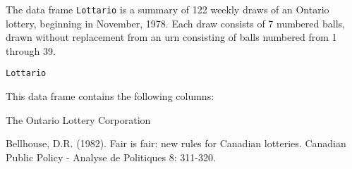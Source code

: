 \begin{Description}\relax
The data frame \verb!Lottario!
is a summary of 122 weekly draws of an Ontario lottery, beginning in
November, 1978.  Each draw consists of 7 numbered balls, drawn without
replacement from an urn consisting of balls numbered from 1 through 39.
\end{Description}
\begin{Usage}
\begin{verbatim}Lottario\end{verbatim}
\end{Usage}
\begin{Format}\relax
This data frame contains the following columns:
\end{Format}
\begin{Source}\relax
The Ontario Lottery Corporation
\end{Source}
\begin{References}\relax
Bellhouse, D.R. (1982). Fair is fair:  new rules for Canadian lotteries.
Canadian Public Policy - Analyse de Politiques 8: 311-320.
\end{References}
\begin{Examples}
\end{Examples}

